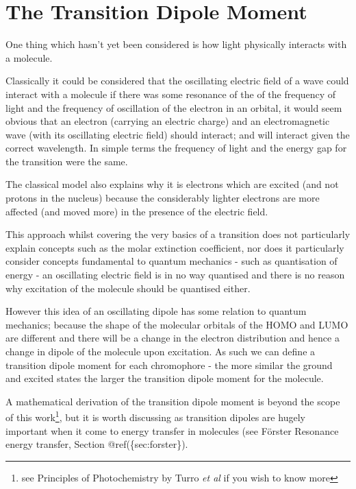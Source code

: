 \documentclass[
]{book}
\begin{document}
\hypertarget{sec:transdipole}{%
\section{The Transition Dipole Moment}\label{sec:transdipole}}

One thing which hasn't yet been considered is how light physically interacts with a molecule.

Classically it could be considered that the oscillating electric field of a wave could interact with a molecule if there was some resonance of the of the frequency of light and the frequency of oscillation of the electron in an orbital, it would seem obvious that an electron (carrying an electric charge) and an electromagnetic wave (with its oscillating electric field) should interact; and will interact given the correct wavelength. In simple terms the frequency of light and the energy gap for the transition were the same.

The classical model also explains why it is electrons which are excited (and not protons in the nucleus) because the considerably lighter electrons are more affected (and moved more) in the presence of the electric field.

This approach whilst covering the very basics of a transition does not particularly explain concepts such as the molar extinction coefficient, nor does it particularly consider concepts fundamental to quantum mechanics - such as quantisation of energy - an oscillating electric field is in no way quantised and there is no reason why excitation of the molecule should be quantised either.

However this idea of an oscillating dipole has some relation to quantum mechanics; because the shape of the molecular orbitals of the HOMO and LUMO are different and there will be a change in the electron distribution and hence a change in dipole of the molecule upon excitation. As such we can define a transition dipole moment for each chromophore - the more similar the ground and excited states the larger the transition dipole moment for the molecule.

A mathematical derivation of the transition dipole moment is beyond the scope of this work\footnote{see Principles of Photochemistry by Turro \emph{et al} if you wish to know more}, but it is worth discussing as transition dipoles are hugely important when it come to energy transfer in molecules (see Förster Resonance energy transfer, Section @ref(\{sec:forster\}).
\end{document}
